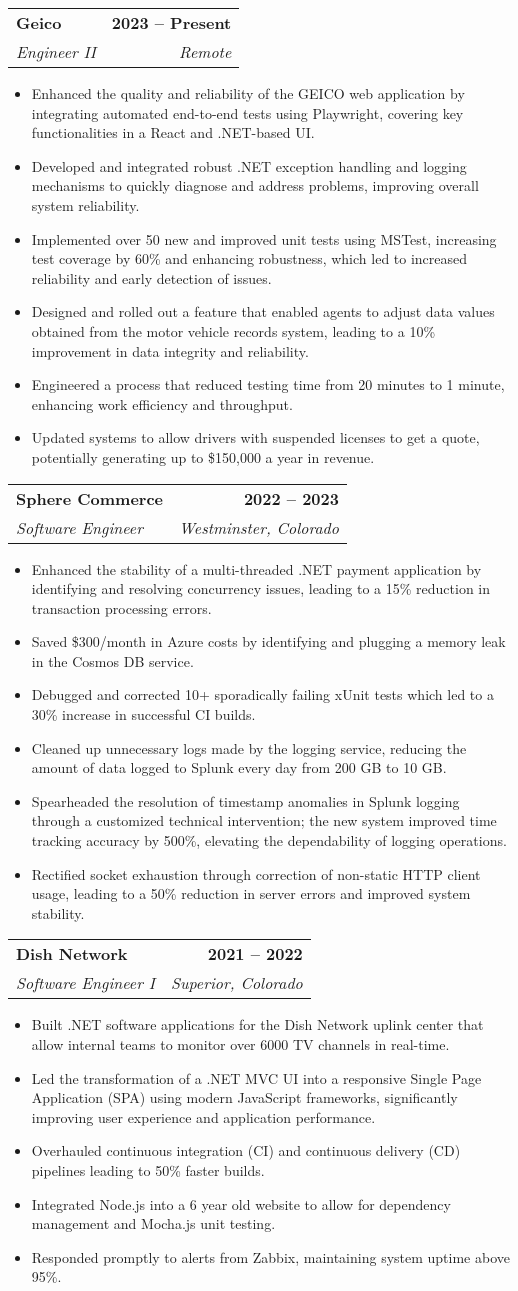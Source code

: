 \documentclass[letterpaper,11pt]{article}
\makeatletter
\newcommand{\resumeItem}[1]{
  \item\small{
    {#1 \vspace{2pt}}
  }
}
\newcommand{\resumeSubheading}[4]{
  \vspace{-2pt}\item
    \begin{tabular*}{1.0\textwidth}[t]{l@{\extracolsep{\fill}}r}
      \textbf{#1} & \textbf{\small #2} \\
      \textit{\small#3} & \textit{\small #4} \\
    \end{tabular*}\vspace{-7pt}
}
\newcommand{\resumeItemListStart}{\begin{itemize}}
\newcommand{\resumeItemListEnd}{\end{itemize}\vspace{-5pt}}
\makeatother
\begin{document}
  	\resumeSubheading
      {Geico}{2023 -- Present}
      {Engineer II}{Remote}
      \resumeItemListStart
	\resumeItem{Enhanced the quality and reliability of the GEICO web application by integrating automated end-to-end tests using Playwright, covering key functionalities in a React and .NET-based UI.}   
	\resumeItem{Developed and integrated robust .NET exception handling and logging mechanisms to quickly diagnose and address problems, improving overall system reliability.}
	\resumeItem{Implemented over 50 new and improved unit tests using MSTest, increasing test coverage by 60\% and enhancing robustness, which led to increased reliability and early detection of issues.}
	\resumeItem{Designed and rolled out a feature that enabled agents to adjust data values obtained from the motor vehicle records system, leading to a 10\% improvement in data integrity and reliability.}
	\resumeItem{Engineered a process that reduced testing time from 20 minutes to 1 minute, enhancing work efficiency and throughput.} 
	\resumeItem{Updated systems to allow drivers with suspended licenses to get a quote, potentially generating up to \$150,000 a year in revenue.}	
      \resumeItemListEnd

    \resumeSubheading
      {Sphere Commerce}{2022 -- 2023}
      {Software Engineer}{Westminster, Colorado}
      \resumeItemListStart
	\resumeItem{Enhanced the stability of a multi-threaded .NET payment application by identifying and resolving concurrency issues, leading to a 15\% reduction in transaction processing errors.}
	\resumeItem{Saved \$300/month in Azure costs by identifying and plugging a memory leak in the Cosmos DB service.}
        \resumeItem{Debugged and corrected 10+ sporadically failing xUnit tests which led to a 30\% increase in successful CI builds.}
	\resumeItem{Cleaned up unnecessary logs made by the logging service, reducing the amount of data logged to Splunk every day from 200 GB to 10 GB.}
        \resumeItem{Spearheaded the resolution of timestamp anomalies in Splunk logging through a customized technical intervention; the new system improved time tracking accuracy by 500\%, elevating the dependability of logging operations. }       
	\resumeItem{Rectified socket exhaustion through correction of non-static HTTP client usage, leading to a 50\% reduction in server errors and improved system stability.}
      \resumeItemListEnd

    \resumeSubheading
      {Dish Network}{2021 -- 2022}
      {Software Engineer I}{Superior, Colorado}
      \resumeItemListStart
        \resumeItem{Built .NET software applications for the Dish Network uplink center that allow internal teams to monitor over 6000 TV channels in real-time.}
	\resumeItem{Led the transformation of a .NET MVC UI into a responsive Single Page Application (SPA) using modern JavaScript frameworks, significantly improving user experience and application performance.}
	\resumeItem{Overhauled continuous integration (CI) and continuous delivery (CD) pipelines leading to 50\% faster builds.}
        \resumeItem{Integrated Node.js into a 6 year old website to allow for dependency management and Mocha.js unit testing.}
        \resumeItem{Responded promptly to alerts from Zabbix, maintaining system uptime above 95\%.}
    \resumeItemListEnd
\end{document}

